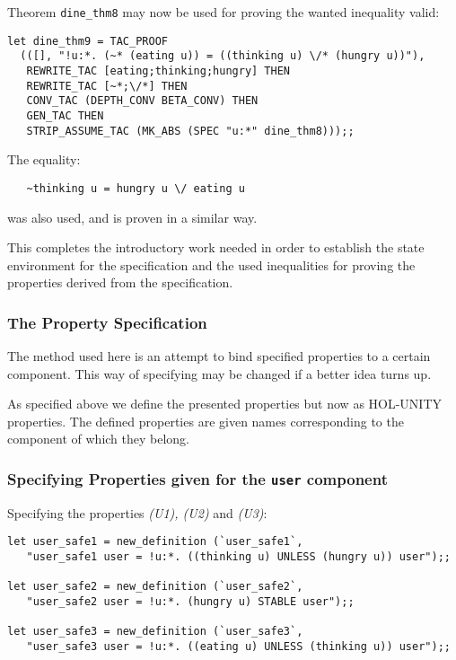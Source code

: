 Theorem {\tt dine\_thm8} may now be used for proving the wanted inequality 
valid:
{\footnotesize 
\begin{verbatim}
let dine_thm9 = TAC_PROOF
  (([], "!u:*. (~* (eating u)) = ((thinking u) \/* (hungry u))"),
   REWRITE_TAC [eating;thinking;hungry] THEN
   REWRITE_TAC [~*;\/*] THEN
   CONV_TAC (DEPTH_CONV BETA_CONV) THEN
   GEN_TAC THEN
   STRIP_ASSUME_TAC (MK_ABS (SPEC "u:*" dine_thm8)));;
\end{verbatim}
}

The equality:
{\footnotesize 
\begin{verbatim}
   ~thinking u = hungry u \/ eating u
\end{verbatim}
}
was also used, and is proven in a similar way.

This completes the introductory work needed in order to establish the state
environment for the specification and the used inequalities for proving the
properties derived from the specification.

\subsubsection{The Property Specification}

The method used here is an attempt to bind specified properties to a certain 
component.  This way of specifying may be changed if a better idea turns up.

As specified above we define the presented properties but now as HOL-UNITY
properties.  The defined properties are given names corresponding to the
component of which they belong.


\subsubsection{Specifying Properties given for the {\tt user} component}

Specifying the properties {\it (U1), (U2)} and {\it (U3)}:
{\footnotesize 
\begin{verbatim}
let user_safe1 = new_definition (`user_safe1`,
   "user_safe1 user = !u:*. ((thinking u) UNLESS (hungry u)) user");;

let user_safe2 = new_definition (`user_safe2`,
   "user_safe2 user = !u:*. (hungry u) STABLE user");;

let user_safe3 = new_definition (`user_safe3`,
   "user_safe3 user = !u:*. ((eating u) UNLESS (thinking u)) user");;
\end{verbatim}
}

